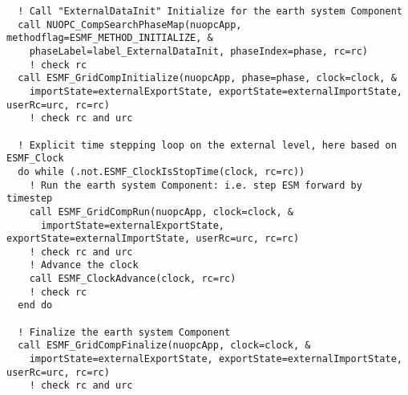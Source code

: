 \begin{verbatim}
  ! Call "ExternalDataInit" Initialize for the earth system Component
  call NUOPC_CompSearchPhaseMap(nuopcApp, methodflag=ESMF_METHOD_INITIALIZE, &
    phaseLabel=label_ExternalDataInit, phaseIndex=phase, rc=rc)
    ! check rc
  call ESMF_GridCompInitialize(nuopcApp, phase=phase, clock=clock, &
    importState=externalExportState, exportState=externalImportState, userRc=urc, rc=rc)
    ! check rc and urc

  ! Explicit time stepping loop on the external level, here based on ESMF_Clock
  do while (.not.ESMF_ClockIsStopTime(clock, rc=rc))
    ! Run the earth system Component: i.e. step ESM forward by timestep
    call ESMF_GridCompRun(nuopcApp, clock=clock, &
      importState=externalExportState, exportState=externalImportState, userRc=urc, rc=rc)
    ! check rc and urc
    ! Advance the clock
    call ESMF_ClockAdvance(clock, rc=rc)
    ! check rc
  end do

  ! Finalize the earth system Component
  call ESMF_GridCompFinalize(nuopcApp, clock=clock, &
    importState=externalExportState, exportState=externalImportState, userRc=urc, rc=rc)
    ! check rc and urc
\end{verbatim}




